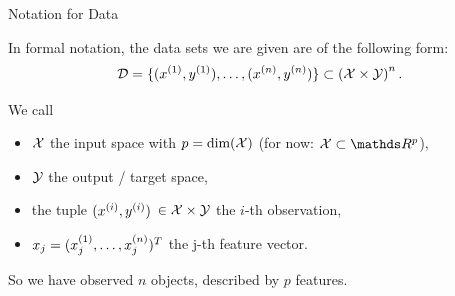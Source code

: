 \documentclass[11pt,compress,t,notes=noshow, xcolor=table]{beamer}
\begin{document}
\begin{vbframe}{Notation for Data}

In formal notation, the data sets we are given are of the following form:
\[
\mathcal{D} = \{ (x^{(1)}, y^{(1)}), \ldots, (x^{(n)}, y^{(n)})\} \subset \left(\mathcal{X} \times \mathcal{Y}\right)^n.
\]

We call

\begin{itemize}

  \item $\mathcal{X}$  the input space with $p = \text{dim}(\mathcal{X})$ (for now: 
  $\Xspace \subset \R^p$),
  
  \item $\mathcal{Y}$ the output / target space,
  
  \item the tuple \((x^{(i)}, y^{(i)})\) $\in \mathcal{X}\times \mathcal{Y}$ the \(i\)-th observation,
  
  \item $x_j = (x^{(1)}_j, \ldots, x^{(n)}_j)^T$ the j-th feature vector.
  
\end{itemize}

\lz

So we have observed $n$ objects, described by $p$ features.

\end{vbframe}

\end{document}
